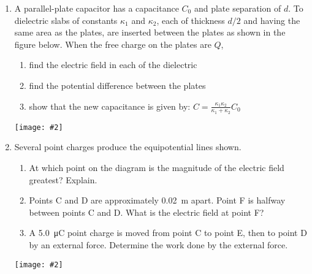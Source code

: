 \documentclass[11pt]{article}
\newcommand{\pic}[2]{\texttt{[image: \#2]}}
\begin{document}
\begin{enumerate}[leftmargin=15pt]
\item A parallel-plate capacitor has a capacitance $C_0$ and plate separation
  of $d$. To dielectric slabs of constants $\kappa_1$ and $\kappa_2$, each of
  thickness $d/2$ and having the same area as the plates, are inserted between
  the plates as shown in the figure below. When the free charge on the plates
  are $Q$,
  \begin{enumerate}[noitemsep]
  \item find the electric field in each of the dielectric
  \item find the potential difference between the plates
  \item show that the new capacitance is given by:
    $\displaystyle C=\frac{\kappa_1\kappa_2}{\kappa_1+\kappa_2}C_0$
  \end{enumerate}
  \pic{0.25}{stacked.png}
  \vspace{1.5in}

\item Several point charges produce the equipotential lines shown.
  \begin{enumerate}[noitemsep]
  \item At which point on the diagram is the magnitude of the electric field
    greatest? Explain.
  \item Points C and D are approximately \SI{0.02}{\metre} apart. Point F is
    halfway between points C and D. What is the electric field at point F?
  \item A \SI{5.0}{\micro\coulomb} point charge is moved from point C to point
    E, then to point D by an external force. Determine the work done by the
    external force.
  \end{enumerate}
  \pic{.45}{equipotentials.png}
\end{enumerate}
\end{document}
